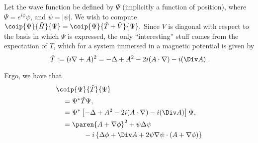 \documentclass[twocolumn,showpacs,preprintnumbers,amsmath,amssymb,nofootinbib,pra,floatfix]{revtex4}
\begin{document}
Let the wave function be defined by $\Psi$ (implicitly a function of position), where $\Psi=e^{i\phi} \psi$, and $\psi=|\psi|$.  We wish to compute $\coip{\Psi}{\hat H}{\Psi} = \coip{\Psi}{\hat T+\hat V}{\Psi}.$  Since $V$ is diagonal with respect to the basis in which $\Psi$ is expressed, the only ``interesting'' stuff comes from the expectation of $T$, which for a system immersed in a magnetic potential is given by $$\hat T:=(i\nabla + A)^2 = -\Delta + A^2 - 2i(A\cdot \nabla) - i(\Div A).$$

Ergo, we have that
$$
\begin{aligned}
&\coip{\Psi}{\hat T}{\Psi} \\
&\quad = \Psi^* \hat T \Psi, \\
&\quad = \Psi^* \left[-\Delta + A^2 - 2i(A\cdot \nabla) - i(\Div A)\right] \Psi, \\
&\quad = \paren{A+\nabla \phi}^2 + \psi\Delta \psi \\ &\qquad\qquad - i\left\{\Delta \phi + \Div A + 2\psi\nabla\psi \cdot (A+\nabla\phi)\right\}
\end{aligned}
$$
\end{document}
